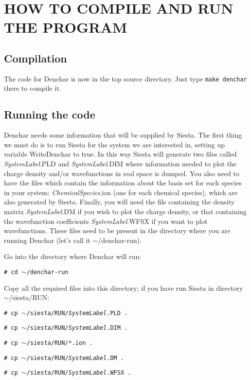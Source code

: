 \section{HOW TO COMPILE AND RUN THE PROGRAM}

\subsection{Compilation}

The code for {\sc Denchar} is now in the top source directory. Just
type {\tt make denchar} there to compile it.


\subsection{Running the code}

 {\sc Denchar} needs some information that will be supplied by {\sc Siesta}. 
 The first thing we must do is to run {\sc Siesta} for 
 the system we are interested in,
 setting up variable WriteDenchar to true. 
 In this way {\sc Siesta} will generate
 two files called {\it SystemLabel}.PLD and {\it SystemLabel}.DIM
 where information 
 needed to plot the charge density and/or wavefunctions 
 in real space is dumped. You also need to have the files which
 contain the information about the basis set for each species
 in your system: {\it ChemicalSpecies}.ion (one for each
 chemical species), which
 are also generated by  {\sc Siesta}.
 Finally, you will need the file containing the
 density matrix {\it SystemLabel}.DM if you wish to plot
 the charge density, or that containing the wavefunction
 coefficients {\it SystemLabel}.WFSX if you want to plot
 wavefunctions. These files need to be present in the
 directory where you are running {\sc Denchar} (let's call it
 $\sim$/denchar-run).

 Go into the directory where {\sc Denchar} will run:

 {\tt \# cd $\sim$/denchar-run}

 Copy all the required files into this directory; if you
 have run {\sc Siesta} in directory $\sim$/siesta/RUN:

 {\tt \# cp $\sim$/siesta/RUN/{\it SystemLabel}.PLD .}

 {\tt \# cp $\sim$/siesta/RUN/{\it SystemLabel}.DIM .}

 {\tt \# cp $\sim$/siesta/RUN/*.ion .}

 {\tt \# cp $\sim$/siesta/RUN/{\it SystemLabel}.DM .}

 {\tt \# cp $\sim$/siesta/RUN/{\it SystemLabel}.WFSX .}

